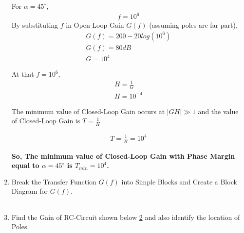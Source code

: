 \begin{enumerate}[label=\thesubsection.\arabic*.,ref=\thesubsection.\theenumi]
For $\alpha=45^{\circ}$,
\begin{align}
f=10^{6}
\end{align}
By substituting $f$ in Open-Loop Gain $G(f)$ (assuming poles are far part), 
\begin{align}
G(f) = 200 - 20log(10^{6})\\
G(f) = 80 dB \\
G = 10^{4}
\end{align}

At that $f = 10^{6}$, 
\begin{align}
H = \frac{1}{G}\\
H = 10^{-4}
\end{align}

The minimum value of Closed-Loop Gain occurs at $|GH| \gg 1$ and the value of Closed-Loop Gain is $T=\frac{1}{H}$

\begin{align}
T = \frac{1}{H} = 10^{4}
\end{align}

\textbf{So, The minimum value of Closed-Loop Gain with Phase Margin equal to $\alpha=45^{\circ}$ is $T_{min} = 10^{4}$.}\\

\item Break the Transfer Function $G(f)$ into Simple Blocks and Create a Block Diagram for $G(f)$.\\
\solution\\
\begin{figure}[ht!]
	\begin{center}
		\resizebox{\columnwidth}{!}{}
	\end{center}
	\caption{}
	\label{fig:RC Circuit}
\end{figure}


\item Find the Gain of RC-Circuit shown below \ref{fig:RC Circuit} and also identify the location of Poles.
\begin{figure}[ht!]
	\begin{center}
		\resizebox{\columnwidth/2}{!}{}
	\end{center}
	\caption{}
	\label{fig:RC Circuit}
\end{figure}


\end{enumerate}
